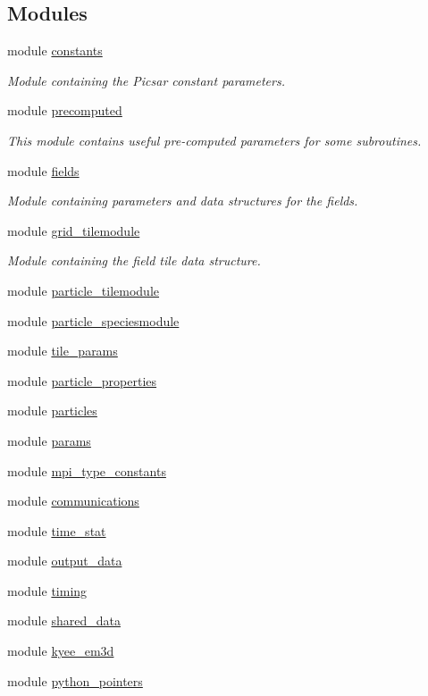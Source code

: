 \subsection*{Modules}
\begin{DoxyCompactItemize}
\item 
module \hyperlink{namespaceconstants}{constants}
\begin{DoxyCompactList}\small\item\em Module containing the Picsar constant parameters. \end{DoxyCompactList}\item 
module \hyperlink{namespaceprecomputed}{precomputed}
\begin{DoxyCompactList}\small\item\em This module contains useful pre-\/computed parameters for some subroutines. \end{DoxyCompactList}\item 
module \hyperlink{namespacefields}{fields}
\begin{DoxyCompactList}\small\item\em Module containing parameters and data structures for the fields. \end{DoxyCompactList}\item 
module \hyperlink{namespacegrid__tilemodule}{grid\+\_\+tilemodule}
\begin{DoxyCompactList}\small\item\em Module containing the field tile data structure. \end{DoxyCompactList}\item 
module \hyperlink{namespaceparticle__tilemodule}{particle\+\_\+tilemodule}
\item 
module \hyperlink{namespaceparticle__speciesmodule}{particle\+\_\+speciesmodule}
\item 
module \hyperlink{namespacetile__params}{tile\+\_\+params}
\item 
module \hyperlink{namespaceparticle__properties}{particle\+\_\+properties}
\item 
module \hyperlink{namespaceparticles}{particles}
\item 
module \hyperlink{namespaceparams}{params}
\item 
module \hyperlink{namespacempi__type__constants}{mpi\+\_\+type\+\_\+constants}
\item 
module \hyperlink{namespacecommunications}{communications}
\item 
module \hyperlink{namespacetime__stat}{time\+\_\+stat}
\item 
module \hyperlink{namespaceoutput__data}{output\+\_\+data}
\item 
module \hyperlink{namespacetiming}{timing}
\item 
module \hyperlink{namespaceshared__data}{shared\+\_\+data}
\item 
module \hyperlink{namespacekyee__em3d}{kyee\+\_\+em3d}
\item 
module \hyperlink{namespacepython__pointers}{python\+\_\+pointers}
\end{DoxyCompactItemize}
